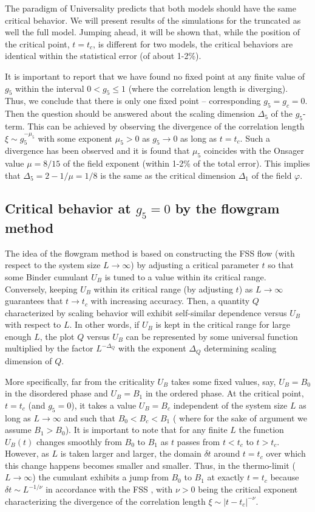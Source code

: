\documentclass[prb,aps,twocolumn,groupedaddress,floats,showpacs,final]{revtex4}
\begin{document}
The paradigm of Universality predicts that both models should have the same critical behavior.
We will present results of the simulations for the truncated as well the full model. Jumping ahead, it will be shown that, while the position of the critical point, $t=t_c$, is different for two models, the critical behaviors are identical within the statistical error (of about 1-2\%).  

It is important to report that we have found no fixed point  at any finite value of $g_5$ within the interval $0<g_5 \leq 1$ (where the correlation length is diverging). Thus, we conclude that there is only one fixed point -- corresponding $g_5=g_c=0$. Then the question should be answered about the scaling dimension $\Delta_5$ of the $g_5$-term. 
This can be achieved by observing the divergence of the correlation length $\xi \sim g_5^{-\mu_5}$ with some exponent $\mu_5>0$ as $g_5 \to 0$ as long as $t=t_c$. Such a divergence has been observed and it is found that $\mu_5$ coincides with the Onsager value $\mu=8/15$ of the field exponent (within 1-2\% of the total error). This implies that $\Delta_5=2-1/\mu=1/8$ is the same as the critical dimension $\Delta_1$ of the field $\varphi$.


\subsection{Critical behavior at $g_5=0$ by the flowgram method}
The idea of the flowgram method \cite{Annals,NJP} is based on constructing the FSS flow (with respect to the system size $L\to \infty$) by adjusting a critical parameter  $t$ so that some Binder cumulant $U_B$ \cite{Binder} is tuned to a value within  its critical range. Conversely, keeping $U_B$ within its critical range (by adjusting $t$) as $L\to \infty$ guarantees that $t \to t_c$ with  increasing accuracy. Then, a quantity $Q$ characterized by scaling  behavior will exhibit self-similar dependence versus $U_B$  with respect to $L$. In other words, if $U_B$ is kept in the critical range for large enough $L$, the plot  $Q$ versus $U_B$ can be represented by some universal function multiplied by the factor $L^{-\Delta_Q}$ with the exponent $\Delta_Q$ determining scaling dimension of $Q$.  

More specifically, far from the criticality $U_B$ takes some fixed values, say, $U_B=B_0$ in the disordered phase and $U_B=B_1$ in the ordered phase. At the critical point, $t=t_c$ (and $g_5=0$), it takes a value $U_B=B_c$ independent of the system size $L$ as long as $L \to \infty$ and such that $B_0 < B_c<B_1$ ( where for the sake of argument we assume $B_1>B_0$).
It is important to note that for any finite $L$ the function $U_B(t)$ changes smoothly from $B_0$ to $B_1$ as $t$ passes from $t<t_c $ to $ t>t_c$. However, as $L$ is taken larger and larger, the domain $\delta t$ around $t=t_c$ over which this change happens becomes smaller and smaller. Thus, in the thermo-limit ($L \to \infty$) the cumulant exhibits a jump from $B_0$ to $B_1$
at exactly $t=t_c$ because $\delta t \sim L^{-1/\nu}$  in accordance with the FSS \cite{FSS}, with $\nu >0$ being the critical exponent characterizing the divergence of the correlation length $\xi \sim |t-t_c|^{-\nu}$. 
\end{document}
